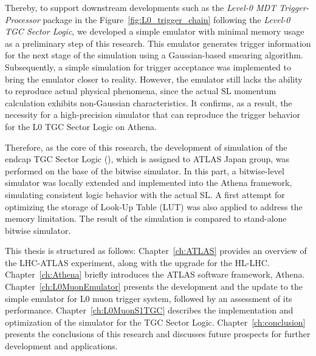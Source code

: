 Thereby, to support downstream developments such as the \textit{Level-0 MDT Trigger-Processor} package in the Figure~\ref{fig:L0_trigger_chain} following the \textit{Level-0 TGC Sector Logic}, we developed a simple emulator with minimal memory usage as a preliminary step of this research. This emulator generates trigger information for the next stage of the simulation using a Gaussian-based smearing algorithm. Subsequently, a simple simulation for trigger acceptance was implemented to bring the emulator closer to reality. However, the emulator still lacks the ability to reproduce actual physical phenomena, since the actual SL momentum calculation exhibits non-Gaussian characteristics. It confirms, as a result, the necessity for a high-precision simulator that can reproduce the trigger behavior for the L0 TGC Sector Logic on Athena.

Therefore, as the core of this research, the development of simulation of the endcap TGC Sector Logic (\SL), which is assigned to ATLAS Japan group, was performed on the base of the bitwise simulator. In this part, a bitwise-level simulator was locally extended and implemented into the Athena framework, simulating consistent logic behavior with the actual SL. A first attempt for optimizing the storage of Look-Up Table (LUT) was also applied to address the memory limitation. The result of the simulation is compared to stand-alone bitwise simulator.

This thesis is structured as follows: Chapter~\ref{ch:ATLAS} provides an overview of the LHC-ATLAS experiment, along with the upgrade for the HL-LHC. Chapter~\ref{ch:Athena} briefly introduces the ATLAS software framework, Athena. Chapter~\ref{ch:L0MuonEmulator} presents the development and the update to the simple emulator for L0 muon trigger system, followed by an assessment of its performance. Chapter~\ref{ch:L0MuonS1TGC} describes the implementation and optimization of the simulator for the TGC Sector Logic. Chapter~\ref{ch:conclusion} presents the conclusions of this research and discusses future prospects for further development and applications.